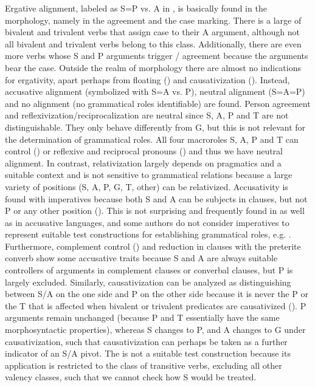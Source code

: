 Ergative alignment, labeled as S=P vs. A in , is basically found in the morphology, namely in the  agreement and the case marking. There is a large  of bivalent and trivalent verbs that assign  case to their A argument, although not all bivalent and trivalent verbs belong to this class. Additionally, there are even more verbs whose S and P arguments trigger / agreement because the arguments bear the  case. Outside the realm of morphology there are almost no indications for ergativity, apart perhaps from  floating () and causativization (). Instead, accusative alignment (symbolized with S=A vs. P), neutral alignment (S=A=P) and no alignment (no grammatical roles identifiable) are found. Person agreement and reflexivization\slash reciprocalization are neutral since S, A, P and T are not distinguishable. They only behave differently from G, but this is not relevant for the determination of grammatical roles. All four macroroles S, A, P and T can control  () or reflexive and reciprocal pronouns () and thus we have neutral alignment. In contrast, relativization largely depends on pragmatics and a suitable context and is not sensitive to grammatical relations because a large variety of positions (S, A, P, G, T, other) can be relativized. Accusativity is found with imperatives because both S and A can be subjects in  clauses, but not P or any other position (). This is not surprising and frequently found in  as well as in accusative languages, and some authors do not consider imperatives to represent suitable test constructions for establishing grammatical roles, e.g. \citet[131]{Dixon1994}. Furthermore, complement control () and  reduction in clauses with the preterite converb show some accusative traits because S and A are always suitable controllers of arguments in complement clauses or converbal clauses, but P is largely excluded. Similarly, causativization can be analyzed as distinguishing between S/A on the one side and P on the other side because it is never the P or the T that is affected when bivalent or trivalent predicates are causativized (). P arguments remain unchanged (because P and T essentially have the same morphosyntactic properties), whereas S changes to P, and A changes to G under causativization, such that causativization can perhaps be taken as a further indicator of an S/A pivot. The  is not a suitable test construction because its application is restricted to the class of transitive verbs, excluding all other valency classes, such that we cannot check how S would be treated.

